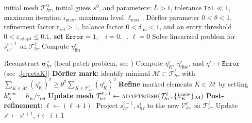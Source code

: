 \documentclass[review,11pt]{article}
\numberwithin{equation}{section}
\def \e  {\varepsilon}
\def \htt {{h\tau}}
\def \calV {\mathcal{V}}
\def \calT {\mathcal{T}}
\begin{document}
\begin{algorithm}[h!]
\caption{\vspace{0.4em}Iterative scheme with equilibrated--flux a posteriori adaptivity\vspace{0.5em}}
\label{alg:Lscheme-adapt}
\begin{minipage}{\linewidth}
\begin{algorithmic}[1]
\Require initial mesh $\mathcal{T}_{h\tau}^0$, initial guess $s^0$, and parameters: $L>1$, tolerance $\texttt{Tol}\ll 1$, maximum iteration $i_{\max}$, maximum level $\ell_{\max}$, D\"orfler parameter 
$0<\texttt{$\theta$}<1$, refinement factor $\texttt{$\mathrm{r}_\mathrm{ref}$}>1$, balance factor
$0<\texttt{$\delta_{\mathrm{lin}}$}<1$, %
and an entry threshold 
$0<\texttt{$\varepsilon_{\mathrm{adapt}}$}\le 0.1$.
\State \textbf{set} $\texttt{Error}=1,\;\;$ $i=0,\;\;$, $\ell=0$
 
  \State Solve linearized problem for $s^{i+1}_\htt$ on $\mathcal T_{h\tau}^\ell$ \hfill {}
  \State Compute $\eta_{\mathrm{lin}}^i$ 

  \If{$\eta^i_{\mathrm{lin}}<\e_{\mathrm{adapt}}$}\hfill  {}
      \State Reconstruct $\boldsymbol{\sigma}^{\,i}_{h\tau}$ 
      \hfill (local patch problem, see )
     \State Compute $\eta^i_K$, $\eta^i_{\mathrm{disc}}$, and $\eta^i\mapsto \texttt{Error}$
      \hfill (see~,\eqref{eq:etaK})
      \State \textbf{Dörfler mark:} identify minimal $\mathcal{M}\subset\mathcal{T}_{h\tau}^\ell$ with
       $\sum_{K\in\mathcal M}(\eta^i_K)^2 \ge \theta^2\sum_{K\in\mathcal{T}_{h\tau}^\ell}(\eta^i_K)^2$
        \State \textbf{Refine} marked elements 
               $K\in\mathcal{M}$ by setting 
               $h_K^{\mathrm{new}} = h_K / \texttt{$\mathrm{r}_\mathrm{ref}$}$
        \State \textbf{Update mesh} $\mathcal T_{h\tau}^{\ell+1}\gets\textsc{adaptmesh}(\mathcal T_{h\tau}^\ell,\{h_K^{\mathrm{new}}\}_{\mathcal{M}})$  
         \State \textbf{Post-refinement:} $\ell\gets (\ell+1)$. Project $s^{i+1}_{h\tau}, s^{i}_{h\tau}$ to the new $\calV_\htt^{\ell}$ on $\calT_{h\tau}^\ell$
     \EndIf
  \EndIf
  \State Update $s^{i}\gets s^{i+1}$, $i\gets i+1$  
  \EndWhile
\end{algorithmic}
\end{minipage}
\end{algorithm}
\end{document}
